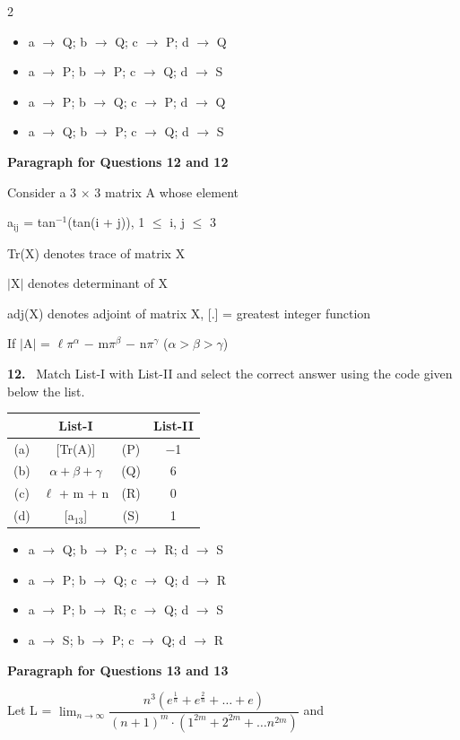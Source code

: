 \documentclass[10pt]{extarticle}
\newcommand{\qn}[1]{\par\smallskip\noindent\textbf{#1.}~}
\newcommand{\paraq}[2]{\par\smallskip\noindent\textbf{Paragraph for Questions #1 and #2}\par}
\newenvironment{qoptions}{\begin{itemize}[leftmargin=1.8em,itemsep=1pt,topsep=2pt,label={}]}{\end{itemize}}
\newcommand{\opt}[2]{\item[(#1)] #2}
\begin{document}
\begin{multicols}{2}
\begin{qoptions}
\opt{A}{a $\rightarrow$ Q; b $\rightarrow$ Q; c $\rightarrow$ P; d $\rightarrow$ Q}
\opt{B}{a $\rightarrow$ P; b $\rightarrow$ P; c $\rightarrow$ Q; d $\rightarrow$ S}
\opt{C}{a $\rightarrow$ P; b $\rightarrow$ Q; c $\rightarrow$ P; d $\rightarrow$ Q}
\opt{D}{a $\rightarrow$ Q; b $\rightarrow$ P; c $\rightarrow$ Q; d $\rightarrow$ S}
\end{qoptions}
\paraq{12}{12}Consider a 3 $\times$ 3 matrix A whose element\par
a$_\text{ij}$ = tan$^{-1}$(tan(i + j)), 1 $\leq$ i, j $\leq$ 3\par
Tr(X) denotes trace of matrix X\par
$|$X$|$ denotes determinant of X\par
adj(X) denotes adjoint of matrix X, [.] = greatest integer function\par
If $|$A$|$ = $\ell\pi^\alpha$ $-$ m$\pi^\beta$ $-$ n$\pi^\gamma$ ($\alpha>\beta>\gamma$)\par
\qn{12} Match List-I with List-II and select the correct answer using the code given below the list.\par
{\footnotesize\setlength{\tabcolsep}{1.5pt}\noindent\begin{tabular}{|c|c|c|c|}
\hline
 & List-I & & List-II \\
\hline
(a) & [Tr(A)] & (P) & $-$1 \\
\hline
(b) & $\alpha+\beta+\gamma$ & (Q) & 6 \\
\hline
(c) & $\ell$ + m + n & (R) & 0 \\
\hline
(d) & [a$_{13}$] & (S) & 1 \\
\hline
\end{tabular}}\par
\begin{qoptions}
\opt{A}{a $\rightarrow$ Q; b $\rightarrow$ P; c $\rightarrow$ R; d $\rightarrow$ S}
\opt{B}{a $\rightarrow$ P; b $\rightarrow$ Q; c $\rightarrow$ Q; d $\rightarrow$ R}
\opt{C}{a $\rightarrow$ P; b $\rightarrow$ R; c $\rightarrow$ Q; d $\rightarrow$ S}
\opt{D}{a $\rightarrow$ S; b $\rightarrow$ P; c $\rightarrow$ Q; d $\rightarrow$ R}
\end{qoptions}
\paraq{13}{13}Let L = $\displaystyle\lim_{n\to\infty}\dfrac{n^3\left(e^{\frac{1}{n}}+e^{\frac{2}{n}}+\ldots+e\right)}{(n+1)^m\cdot\left(1^{2m}+2^{2m}+\ldots n^{2m}\right)}$ and\par
{}\par

\end{multicols}
\end{document}
